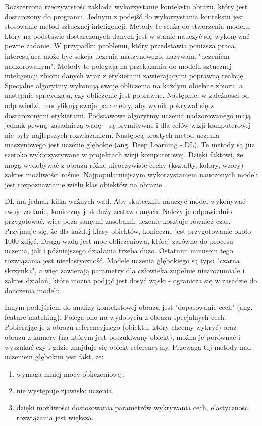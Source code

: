\documentclass[12pt,twoside]{article}
\begin{document}
Rozszerzona rzeczywistość zakłada wykorzystanie kontekstu obrazu, który jest dostarczony do programu. Jednym z podejść do wykorzystania kontekstu jest stosowanie metod sztucznej inteligencji. Metody te służą do stworzenia modelu, który na podstawie dostarczonych danych jest w stanie nauczyć się wykonywać pewne zadanie. W przypadku problemu, który przedstawia poniższa praca, interesująca może być sekcja uczenia maszynowego, nazywana "uczeniem nadzorowanym". Metody te polegają na przekazaniu do modelu sztucznej inteligencji zbioru danych wraz z etykietami zawierającymi poprawną reakcję. Specjalne algorytmy wykonują swoje obliczenia na każdym obiekcie zbioru, a następnie sprawdzają, czy obliczenie jest poprawne. Następnie, w zależności od odpowiedzi, modyfikują swoje parametry, aby wynik pokrywał się z dostarczonymi etykietami. Podstawowe algorytmy uczenia nadzorowanego mają jednak pewną zasadniczą wadę - są prymitywne i dla celów wizji komputerowej nie były najlepszych rozwiązaniem. Następcą prostych metod uczenia maszynowego jest uczenie głębokie (ang. Deep Learning - DL). Te metody są już szeroko wykorzystywane w projektach wizji komputerowej. Dzięki faktowi, że mogą wydobywać z obrazu różne nieoczywiste cechy (kształty, kolory, wzory) zakres możliwości rośnie. Najpopularniejszym wykorzystaniem nauczonych modeli jest rozpoznawianie wielu klas obiektów na obrazie.

DL ma jednak kilka ważnych wad. Aby skutecznie nauczyć model wykonywać swoje zadanie, konieczny jest duży zestaw danych. Należy je odpowiednio przygotować, więc poza samymi zasobami, uczenie kosztuje również czas. Przyjmuje się, że dla każdej klasy obiektów, konieczne jest przygotowanie około 1000 zdjęć. Drugą wadą jest moc obliczeniowa, której zarówno do procesu uczenia, jak i późniejszego działania trzeba dużo. Ostatnim minusem tego rozwiązania jest nieelastyczność. Modele uczenia głębokiego są typu "czarna skrzynka", a więc zawierają parametry dla człowieka zupełnie niezrozumiałe i zakres działań, które można podjąć jest dosyć wąski - ogranicza się w zasadzie do douczenia modelu.

Innym podejściem do analizy kontekstowej obrazu jest "dopasowanie cech" (ang. feature matching). Polega ono na wydobyciu z obrazu specjalnych cech. Pobierając je z obrazu referencyjnego (obiektu, który chcemy wykryć) oraz obrazu z kamery (na którym jest poszukiwany obiekt), można je porównać i wyszukać czy i gdzie znajduje się obiekt referencyjny. Przewagą tej metody nad uczeniem głębokim jest fakt, że:
\begin{enumerate}[label=\alph*), leftmargin=1.25cm]
	\item wymaga mniej mocy obliczeniowej,
	\item nie występuje zjawisko uczenia,
	\item dzięki możliwości dostosowania parametrów wykrywania cech, elastyczność rozwiązania jest większa.
\end{enumerate}
\end{document}

